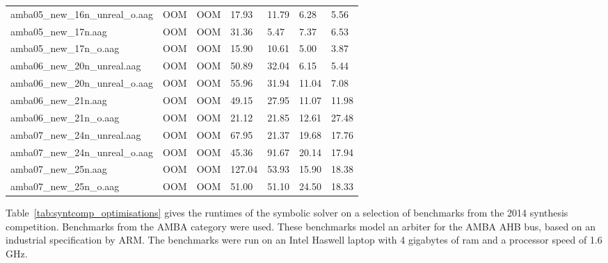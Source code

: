 \begin{sidewaystable}
\begin{tabular}{|l|l|l|l|l|l|l|}
        amba05\_new\_16n\_unreal\_o.aag & OOM    & OOM      & 17.93    & 11.79         & 6.28           & 5.56          \\
        amba05\_new\_17n.aag            & OOM    & OOM      & 31.36    & 5.47          & 7.37           & 6.53          \\
        amba05\_new\_17n\_o.aag         & OOM    & OOM      & 15.90    & 10.61         & 5.00           & 3.87          \\
        amba06\_new\_20n\_unreal.aag    & OOM    & OOM      & 50.89    & 32.04         & 6.15           & 5.44          \\
        amba06\_new\_20n\_unreal\_o.aag & OOM    & OOM      & 55.96    & 31.94         & 11.04          & 7.08          \\
        amba06\_new\_21n.aag            & OOM    & OOM      & 49.15    & 27.95         & 11.07          & 11.98         \\
        amba06\_new\_21n\_o.aag         & OOM    & OOM      & 21.12    & 21.85         & 12.61          & 27.48         \\
        amba07\_new\_24n\_unreal.aag    & OOM    & OOM      & 67.95    & 21.37         & 19.68          & 17.76         \\
        amba07\_new\_24n\_unreal\_o.aag & OOM    & OOM      & 45.36    & 91.67         & 20.14          & 17.94         \\
        amba07\_new\_25n.aag            & OOM    & OOM      & 127.04   & 53.93         & 15.90          & 18.38         \\
        amba07\_new\_25n\_o.aag         & OOM    & OOM      & 51.00    & 51.10         & 24.50          & 18.33         \\

        \hline
    \end{tabular}
    \caption{Performance of various optimisations when applied to the basic symbolic solver}
    \label{tab:syntcomp_optimisations}
\end{sidewaystable}


Table~\ref{tab:syntcomp_optimisations} gives the runtimes of the symbolic solver on a selection of benchmarks from the 2014 synthesis competition. Benchmarks from the AMBA category were used. These benchmarks model an arbiter for the AMBA AHB bus, based on an industrial specification by ARM. The benchmarks were run on an Intel Haswell laptop with 4 gigabytes of ram and a processor speed of 1.6 GHz.


